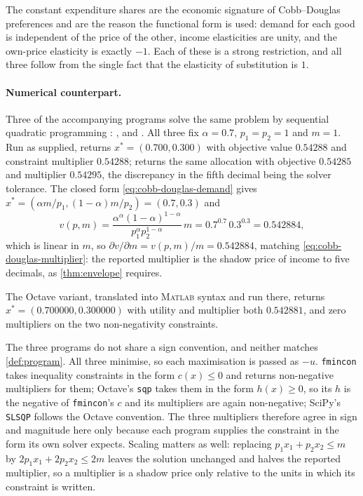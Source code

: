 The constant expenditure shares are the economic signature of Cobb--Douglas
preferences and are the reason the functional form is used: demand for each good
is independent of the price of the other, income elasticities are unity, and the
own-price elasticity is exactly $-1$. Each of these is a strong restriction, and
all three follow from the single fact that the elasticity of substitution is $1$.

\paragraph{Numerical counterpart.} Three of the accompanying programs solve the
same problem by sequential quadratic programming
\autocite[slides 33--36]{fukuda2026optimization}: ,
 and . All
three fix $\alpha=0.7$, $p_1=p_2=1$ and $m=1$. Run as supplied,
 returns $x^\ast=(0.700,0.300)$ with objective
value $0.54288$ and constraint multiplier $0.54288$;
 returns the same allocation with objective
$0.54285$ and multiplier $0.54295$, the discrepancy in the fifth decimal being
the solver tolerance. The closed form \eqref{eq:cobb-douglas-demand} gives
$x^\ast=(\alpha m/p_1,(1-\alpha)m/p_2)=(0.7,0.3)$ and
\[
	v(p,m)=\frac{\alpha^{\alpha}(1-\alpha)^{1-\alpha}}{p_1^{\alpha}p_2^{1-\alpha}}\,m
	=0.7^{0.7}\,0.3^{0.3}=0.542884 ,
\]
which is linear in $m$, so $\partial v/\partial m=v(p,m)/m=0.542884$, matching
\eqref{eq:cobb-douglas-multiplier}: the reported multiplier is the shadow price
of income to five decimals, as \autoref{thm:envelope} requires.

The Octave variant, translated into \textsc{Matlab} syntax and run there,
returns $x^\ast=(0.700000,0.300000)$ with utility and multiplier both
$0.542881$, and zero multipliers on the two non-negativity constraints.

The three programs do not share a sign convention, and neither matches
\autoref{def:program}. All three minimise, so each maximisation is passed as
$-u$. \verb|fmincon| takes inequality constraints in the form $c(x)\leq0$ and
returns non-negative multipliers for them; Octave's \verb|sqp| takes them in the
form $h(x)\geq0$, so its $h$ is the negative of \verb|fmincon|'s $c$ and its
multipliers are again non-negative; SciPy's \verb|SLSQP| follows the Octave
convention. The three multipliers therefore agree in sign and magnitude here
only because each program supplies the constraint in the form its own solver
expects. Scaling matters as well: replacing $p_1x_1+p_2x_2\leq m$ by
$2p_1x_1+2p_2x_2\leq2m$ leaves the solution unchanged and halves the reported
multiplier, so a multiplier is a shadow price only relative to the units in
which its constraint is written.

